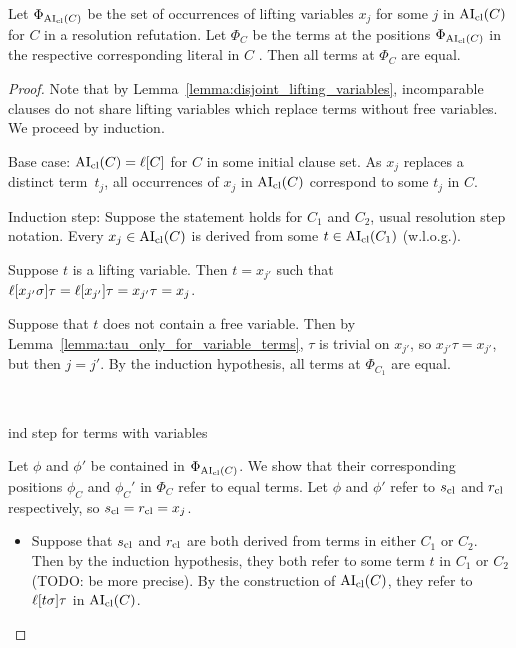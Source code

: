 \documentclass[,%
	paper=a4,%
	twoside=false,%
	liststotoc,
	bibtotoc,
	draft=false,%
	numbers=noendperiod
]{scrartcl}
\begin{document}
\begin{conj}
	Let $\Phi_{\operatorname{AI}_\mathrm{cl}(C)}$ be the set of occurrences of lifting variables $x_j$ for some $j$ in $\operatorname{AI}_\mathrm{cl}(C)$ for $C$ in a resolution refutation.
	Let $\Phi_{C}$ be the terms at the positions $\Phi_{\operatorname{AI}_\mathrm{cl}(C)}$ in the respective corresponding literal in $C$ .
	Then all terms at $\Phi_C$ are equal.
\end{conj}
\begin{proof}
	Note that by Lemma~\ref{lemma:disjoint_lifting_variables}, incomparable clauses do not share lifting variables which replace terms without free variables. 
	We proceed by induction.

	Base case: $\operatorname{AI}_\mathrm{cl}(C) = \ell[C]$ for $C$ in some initial clause set.
	As $x_j$ replaces a distinct term~$t_j$, all occurrences of $x_j$ in $\operatorname{AI}_\mathrm{cl}(C)$ correspond to some $t_j$ in $C$.

	Induction step:
	Suppose the statement holds for $C_1$ and $C_2$, usual resolution step notation.
	Every $x_j \in \operatorname{AI}_\mathrm{cl}(C)$ is derived from some $t \in \operatorname{AI}_\mathrm{cl}(C_1)$ (w.l.o.g.).
	\begin{compactitem}
	\item
		Suppose $t$ is a lifting variable.
		Then $t = x_{j'}$ such that $\lifboth{x_{j'}\sigma}\tau = \lifboth{x_{j'}}\tau = x_{j'}\tau =\nolinebreak x_j$.

		Suppose that $t$ does not contain a free variable.
		Then by Lemma~\ref{lemma:tau_only_for_variable_terms}, $\tau$ is trivial on $x_{j'}$, so $x_{j'}\tau = x_{j'}$, but then $j=j'$.
		By the induction hypothesis, all terms at $\Phi_{C_1}$ are equal.
	\end{compactitem}

	\bigskip

	~
	\bigskip

	ind step for terms with variables


	Let $\phi$ and $\phi'$ be contained in $\Phi_{\operatorname{AI}_\mathrm{cl}(C)}$. We show that their corresponding positions $\phi_C$ and $\phi_C'$ in $\Phi_C$ refer to equal terms.
	Let $\phi$ and $\phi'$ refer to $s_\mathrm{cl}$ and $r_\mathrm{cl}$ respectively, so $s_\mathrm{cl} = r_\mathrm{cl} = x_j$.
	\begin{itemize}
		\item Suppose that $s_\mathrm{cl}$ and $r_\mathrm{cl}$ are both derived from terms in either $C_1$ or $C_2$.
			Then by the induction hypothesis, they both refer to some term $t$ in $C_1$ or $C_2$ (TODO: be more precise).
			By the construction of $\operatorname{AI}_\mathrm{cl}(C)$, they refer to $\ell[t\sigma]\tau$ in $\operatorname{AI}_\mathrm{cl}(C)$.


\end{itemize}
\end{proof}
\end{document}
